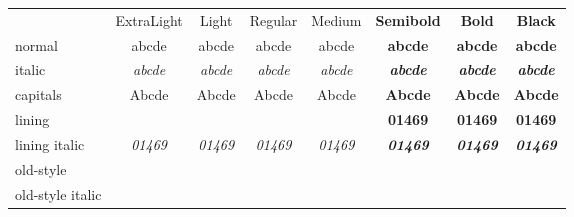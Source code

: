 \documentclass[12pt]{standalone}
\newcommand*\spA{abcde}
\newcommand*\spB{01469}
\newcommand*\spr[1][\spA]{& #1 & #1 & #1 & #1 & #1 & #1 & #1 \\}
\begin{document}
\begin{tabular}{
		>{\sourcecodepro}l
		>{\sourcecodeproextreme}c
		>{\sourcecodeprolight}c
		>{\sourcecodepro}c
		>{\sourcecodepromedium}c
		>{\sourcecodeprolight\bfseries}c
		>{\sourcecodepro\bfseries}c
		>{\sourcecodeproextreme\bfseries}c }
	& ExtraLight & Light & Regular & Medium & Semibold & Bold & Black \\
	normal               \spr
	italic               \spr[\itshape\spA]
	capitals             \spr[\MakeUppercase\spA]
	lining               \spr[\spB]
	lining italic        \spr[\itshape\spB]
	old-style            \spr[\oldstylenums{\spB}]
	old-style italic     \spr[\oldstylenums{\itshape\spB}]
\end{tabular}
\end{document}
